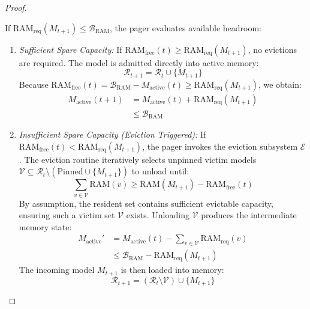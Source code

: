 \begin{proof}
\begin{itemize}
    If $\text{RAM}_{\text{req}}(M_{t+1}) \le \mathcal{B}_{\text{RAM}}$, the pager evaluates available headroom:
    \begin{enumerate}
        \item \textit{Sufficient Spare Capacity:} If $\text{RAM}_{\text{free}}(t) \ge \text{RAM}_{\text{req}}(M_{t+1})$, no evictions are required. The model is admitted directly into active memory:
        \begin{equation}
        \mathcal{R}_{t+1} = \mathcal{R}_t \cup \{M_{t+1}\}
        \end{equation}
        Because $\text{RAM}_{\text{free}}(t) = \mathcal{B}_{\text{RAM}} - M_{\text{active}}(t) \ge \text{RAM}_{\text{req}}(M_{t+1})$, we obtain:
        \begin{equation}
        \begin{aligned}
        M_{\text{active}}(t+1) &= M_{\text{active}}(t) + \text{RAM}_{\text{req}}(M_{t+1}) \\
        &\le \mathcal{B}_{\text{RAM}}
        \end{aligned}
        \end{equation}
        \item \textit{Insufficient Spare Capacity (Eviction Triggered):} If $\text{RAM}_{\text{free}}(t) < \text{RAM}_{\text{req}}(M_{t+1})$, the pager invokes the eviction subsystem $\mathcal{E}$. The eviction routine iteratively selects unpinned victim models $\mathcal{V} \subseteq \mathcal{R}_t \setminus (\text{Pinned} \cup \{M_{t+1}\})$ to unload until:
        \begin{equation}
        \sum_{v \in \mathcal{V}} \text{RAM}(v) \ge \text{RAM}(M_{t+1}) - \text{RAM}_{\text{free}}(t)
        \end{equation}
        By assumption, the resident set contains sufficient evictable capacity, ensuring such a victim set $\mathcal{V}$ exists. Unloading $\mathcal{V}$ produces the intermediate memory state:
        \begin{equation}
        \begin{aligned}
        M_{\text{active}}' &= M_{\text{active}}(t) - \sum_{v \in \mathcal{V}} \text{RAM}_{\text{req}}(v) \\
        &\le \mathcal{B}_{\text{RAM}} - \text{RAM}_{\text{req}}(M_{t+1})
        \end{aligned}
        \end{equation}
        The incoming model $M_{t+1}$ is then loaded into memory:
        \begin{equation}
        \mathcal{R}_{t+1} = (\mathcal{R}_t \setminus \mathcal{V}) \cup \{M_{t+1}\}

\end{equation}
\end{enumerate}
\end{itemize}
\end{proof}
